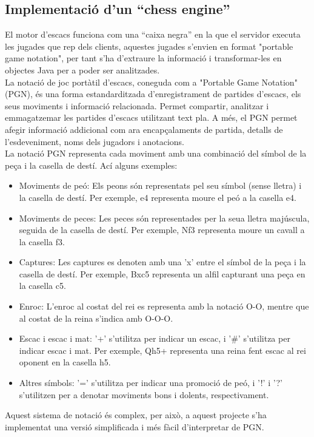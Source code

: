 \subsection{Implementació d’un “chess engine”}
\label{sec:engine}
El motor d’escacs funciona com una “caixa negra” en la que el servidor executa les jugades que rep dels clients, aquestes jugades s'envien en format "portable game notation", per tant s'ha d'extraure la informació i transformar-les en objectes Java per a poder ser analitzades.
\\[3mm]
La notació de joc portàtil d'escacs, coneguda com a "Portable Game Notation" (PGN), és una forma estandarditzada d'enregistrament de partides d'escacs, els seus moviments i informació relacionada. Permet compartir, analitzar i emmagatzemar les partides d'escacs utilitzant text pla. A més, el PGN permet afegir informació addicional com ara encapçalaments de partida, detalls de l'esdeveniment, noms dels jugadors i anotacions.
\\[3mm]
La notació PGN representa cada moviment amb una combinació del símbol de la peça i la casella de destí. Ací alguns exemples:
\begin{itemize}
    \item Moviments de peó: Els peons són representats pel seu símbol (sense lletra) i la casella de destí. Per exemple, e4 representa moure el peó a la casella e4.
    \item Moviments de peces: Les peces són representades per la seua lletra majúscula, seguida de la casella de destí. Per exemple, Nf3 representa moure un cavall a la casella f3.
    \item Captures: Les captures es denoten amb una 'x' entre el símbol de la peça i la casella de destí. Per exemple, Bxc5 representa un alfil capturant una peça en la casella c5.
    \item Enroc: L'enroc al costat del rei es representa amb la notació O-O, mentre que al costat de la reina s'indica amb O-O-O.
    \item Escac i escac i mat: '+' s'utilitza per indicar un escac, i '\#' s'utilitza per indicar escac i mat. Per exemple, Qh5+ representa una reina fent escac al rei oponent en la casella h5.
    \item Altres símbols: '=' s'utilitza per indicar una promoció de peó, i '!' i '?' s'utilitzen per a denotar moviments bons i dolents, respectivament.
\end{itemize}
Aquest sistema de notació és complex, per això, a aquest projecte s'ha implementat una versió simplificada i més fàcil d'interpretar de PGN.
